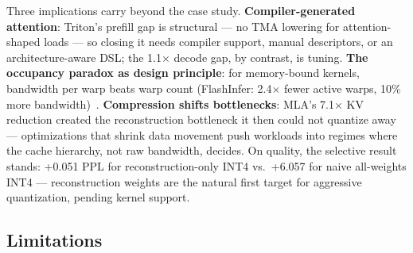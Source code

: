 \documentclass[10pt,twocolumn]{article}
\begin{document}
Three implications carry beyond the case study.  \textbf{Compiler-generated attention}: Triton's prefill gap is structural --- no TMA lowering for attention-shaped loads --- so closing it needs compiler support, manual descriptors, or an architecture-aware DSL; the 1.1$\times$ decode gap, by contrast, is tuning.  \textbf{The occupancy paradox as design principle}: for memory-bound kernels, bandwidth per warp beats warp count (FlashInfer: 2.4$\times$ fewer active warps, 10\% more bandwidth)~\cite{volkov2010}.  \textbf{Compression shifts bottlenecks}: MLA's 7.1$\times$ KV reduction created the reconstruction bottleneck it then could not quantize away --- optimizations that shrink data movement push workloads into regimes where the cache hierarchy, not raw bandwidth, decides.  On quality, the selective result stands: +0.051 PPL for reconstruction-only INT4 vs.\ +6.057 for naive all-weights INT4 --- reconstruction weights are the natural first target for aggressive quantization, pending kernel support.

\subsection{Limitations}
\end{document}
